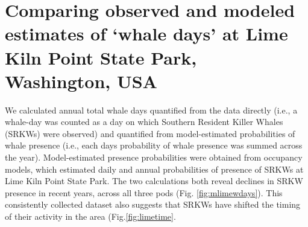 \documentclass{article}
\begin{document}
\section* {Comparing observed and modeled estimates of `whale days' at Lime Kiln Point State Park, Washington, USA}
\par We calculated annual total whale days quantified from the data directly (i.e., a whale-day was counted as a day on which Southern Resident Killer Whales (SRKWs) were observed) and quantified from model-estimated probabilities of whale presence (i.e., each days probability of whale presence was summed across the year). Model-estimated presence probabilities were obtained from occupancy models, which estimated daily and annual probabilities of presence of SRKWs at Lime Kiln Point State Park. The two calculations both reveal declines in SRKW presence in recent years, across all three pods (Fig. \ref{fig:mlimewdays}). This consistently collected dataset also suggests that SRKWs have shifted the timing of their activity in the area (Fig.\ref{fig:limetime}.
\end{document}
